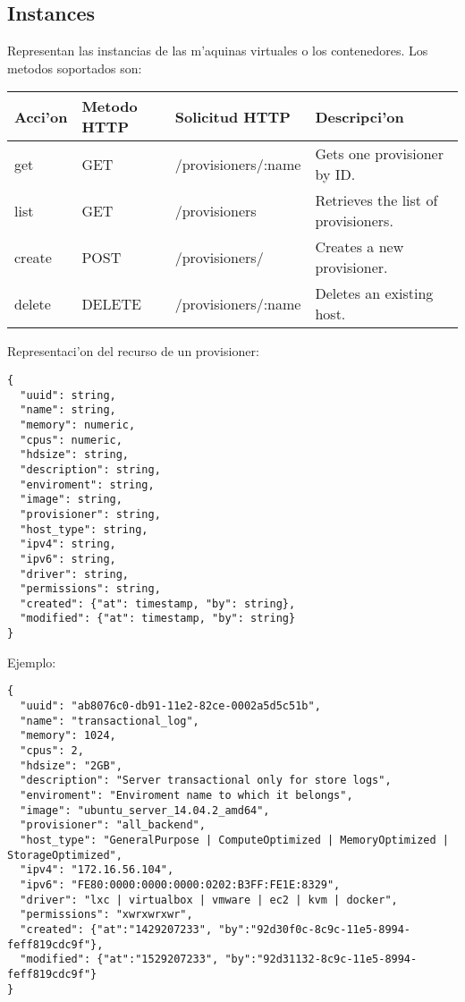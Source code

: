 \subsection{Instances}
Representan las instancias de las m'aquinas virtuales o los contenedores. Los metodos soportados son:

\begin{center}
 \begin{tabular}{| l | l | l | l |}
 \hline
  \rowcolor{blueapi}
  \textbf{Acci'on} & \textbf{Metodo HTTP} & \textbf{Solicitud HTTP} & \textbf{Descripci'on} \\ [0.5ex] 
  \hline\hline
  get & GET & /provisioners/:name & Gets one provisioner by ID. \\
  \hline
  list & GET & /provisioners & Retrieves the list of provisioners. \\
  \hline  
  create & POST & /provisioners/ & Creates a new provisioner. \\
  \hline
  delete & DELETE & /provisioners/:name & Deletes an existing host. \\ [1ex] 
  \hline
\end{tabular}
\end{center}

Representaci'on del recurso de un provisioner:

\medskip
\begin{lstlisting}[style=json]
{
  "uuid": string,
  "name": string,
  "memory": numeric,
  "cpus": numeric,
  "hdsize": string,
  "description": string, 
  "enviroment": string,
  "image": string,
  "provisioner": string,
  "host_type": string,
  "ipv4": string,
  "ipv6": string,
  "driver": string,
  "permissions": string,
  "created": {"at": timestamp, "by": string},
  "modified": {"at": timestamp, "by": string}
}
\end{lstlisting}

Ejemplo:

\medskip
\begin{lstlisting}[style=json]
{
  "uuid": "ab8076c0-db91-11e2-82ce-0002a5d5c51b",
  "name": "transactional_log",
  "memory": 1024,
  "cpus": 2,
  "hdsize": "2GB",
  "description": "Server transactional only for store logs", 
  "enviroment": "Enviroment name to which it belongs",
  "image": "ubuntu_server_14.04.2_amd64",
  "provisioner": "all_backend",
  "host_type": "GeneralPurpose | ComputeOptimized | MemoryOptimized | StorageOptimized",
  "ipv4": "172.16.56.104",
  "ipv6": "FE80:0000:0000:0000:0202:B3FF:FE1E:8329",
  "driver": "lxc | virtualbox | vmware | ec2 | kvm | docker",
  "permissions": "xwrxwrxwr",
  "created": {"at":"1429207233", "by":"92d30f0c-8c9c-11e5-8994-feff819cdc9f"},
  "modified": {"at":"1529207233", "by":"92d31132-8c9c-11e5-8994-feff819cdc9f"}
}
\end{lstlisting}

